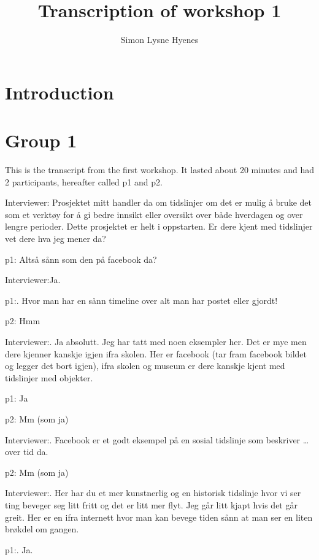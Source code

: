 \documentclass[11pt, norsk, a4paper]{article}
\author{Simon Lysne Hyenes}
\title{Transcription of workshop 1}
\begin{document}
\maketitle{}

\section{Introduction}

\section{Group 1}
This is the transcript from the first workshop. It lasted about 20 minutes and had 2 participants, hereafter called p1 and p2.

\textcolor{myBlue} {Interviewer:} Prosjektet mitt handler da om tidslinjer om det er mulig å bruke det som et verktøy for å gi bedre innsikt eller oversikt over både hverdagen og over lengre perioder. Dette prosjektet er helt i oppstarten. Er dere kjent med tidslinjer vet dere hva jeg mener da?

\textcolor{myGreen} {p1:} Altså sånn som den på facebook da?

\textcolor{myBlue} {Interviewer:}Ja. 

\textcolor{myGreen} {p1:}. Hvor man har en sånn timeline over alt man har postet eller gjordt!

\textcolor{myYellow} {p2:} Hmm

\textcolor{myBlue} {Interviewer:}. Ja absolutt. Jeg har tatt med noen eksempler her. Det er mye men dere kjenner kanskje igjen ifra skolen. Her er facebook (tar fram facebook bildet og legger det bort igjen), ifra skolen og museum er dere kanskje kjent med tidslinjer med objekter.

\textcolor{myGreen} {p1:} Ja

\textcolor{myYellow} {p2:} Mm (som ja)

\textcolor{myBlue} {Interviewer:}. Facebook er et godt eksempel på en sosial tidslinje som beskriver \dots over tid da. 

\textcolor{myYellow} {p2:} Mm (som ja)

\textcolor{myBlue} {Interviewer:}. Her har du et mer kunstnerlig og en historisk tidslinje hvor vi ser ting beveger seg litt fritt og det er litt mer flyt. Jeg går litt kjapt hvis det går greit. Her er en ifra internett hvor man kan bevege tiden sånn at man ser en liten brøkdel om gangen. 

\textcolor{myGreen} {p1:}. Ja.
\end{document}
